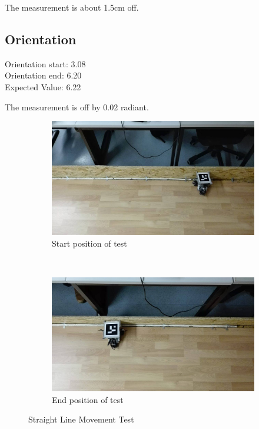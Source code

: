 \documentclass[paper=a4, fontsize=11pt]{scrartcl} %
\numberwithin{equation}{section} %
\numberwithin{figure}{section} %
\numberwithin{table}{section} %
\begin{document}
The measurement is about 1.5cm off.

\subsection{Orientation}
Orientation start: 3.08\\
Orientation end: 6.20\\
Expected Value: 6.22

The measurement is off by 0.02 radiant.

\begin{figure}[H]
    \centering
    \begin{subfigure}[b]{0.45\textwidth}
        \includegraphics[width=\textwidth]{start.jpg}
        \caption{Start position of test}
        \label{fig:start}
    \end{subfigure}
    ~ %
    \begin{subfigure}[b]{0.45\textwidth}
        \includegraphics[width=\textwidth]{end.jpg}
        \caption{End position of test}
        \label{fig:end}
    \end{subfigure}
    \caption{Straight Line Movement Test}\label{fig:test}
\end{figure}





\end{document}
